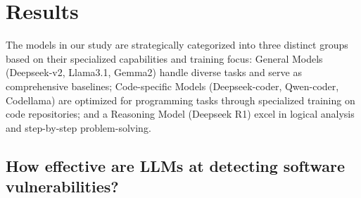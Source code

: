 \documentclass[sigconf,review,anonymous]{acmart}
\begin{document}
\section{Results}
\label{section:result}


The models in our study are strategically categorized into three distinct groups based on their specialized capabilities and training focus: General Models (Deepseek-v2, Llama3.1, Gemma2) handle diverse tasks and serve as comprehensive baselines; Code-specific Models (Deepseek-coder, Qwen-coder, Codellama) are optimized for programming tasks through specialized training on code repositories; and a Reasoning Model (Deepseek R1) excel in logical analysis and step-by-step problem-solving.


\subsection{How effective are LLMs at detecting software vulnerabilities?}
\end{document}
